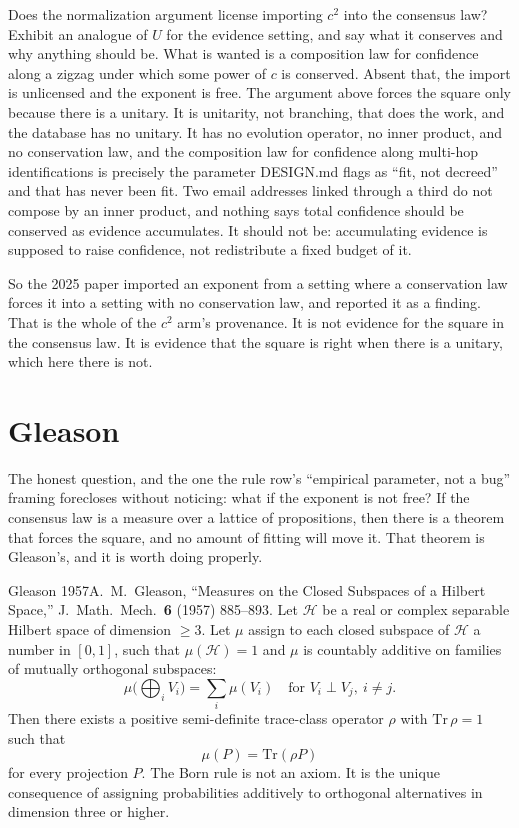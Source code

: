 \begin{Open}{Does the normalization argument license importing $c^2$ into the consensus law?}{Exhibit an analogue of $U$ for the evidence setting, and say what it conserves and why anything should be.}
What is wanted is a composition law for confidence along a zigzag under which some power of $c$ is conserved. Absent that, the import is unlicensed and the exponent is free.
The argument above forces the square only because there is a unitary. It is unitarity, not branching, that does the work, and the database has no unitary. It has no evolution operator, no inner product, and no conservation law, and the composition law for confidence along multi-hop identifications is precisely the parameter DESIGN.md flags as ``fit, not decreed'' and that has never been fit. Two email addresses linked through a third do not compose by an inner product, and nothing says total confidence should be conserved as evidence accumulates. It should not be: accumulating evidence is supposed to raise confidence, not redistribute a fixed budget of it.

So the 2025 paper imported an exponent from a setting where a conservation law forces it into a setting with no conservation law, and reported it as a finding. That is the whole of the $c^2$ arm's provenance. It is not evidence for the square in the consensus law. It is evidence that the square is right when there is a unitary, which here there is not.
\end{Open}

\section{Gleason}

The honest question, and the one the rule row's ``empirical parameter, not a bug'' framing forecloses without noticing: what if the exponent is not free? If the consensus law is a measure over a lattice of propositions, then there is a theorem that forces the square, and no amount of fitting will move it. That theorem is Gleason's, and it is worth doing properly.

\begin{Theorem}{Gleason 1957}{A.\ M.\ Gleason, ``Measures on the Closed Subspaces of a Hilbert Space,'' J.\ Math.\ Mech.\ \textbf{6} (1957) 885--893.}
Let $\mathcal{H}$ be a real or complex separable Hilbert space of dimension $\geq 3$. Let $\mu$ assign to each closed subspace of $\mathcal{H}$ a number in $[0,1]$, such that $\mu(\mathcal{H}) = 1$ and $\mu$ is countably additive on families of mutually orthogonal subspaces:
\begin{equation}
\mu\Big(\bigoplus_i V_i\Big) = \sum_i \mu(V_i) \quad \text{for } V_i \perp V_j,\ i \neq j.
\end{equation}
Then there exists a positive semi-definite trace-class operator $\rho$ with $\mathrm{Tr}\,\rho = 1$ such that
\begin{equation}
\mu(P) = \mathrm{Tr}(\rho P)
\end{equation}
for every projection $P$. The Born rule is not an axiom. It is the unique consequence of assigning probabilities additively to orthogonal alternatives in dimension three or higher.
\end{Theorem}

